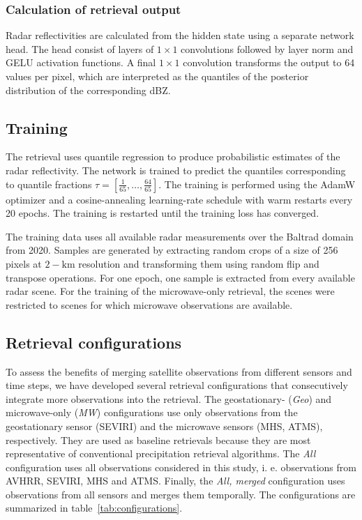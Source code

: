 \documentclass[11pt]{scrartcl}
\begin{document}
\subsubsection{Calculation of retrieval output}


Radar reflectivities are calculated from the hidden state using a separate
network head. The head consist of layers of $1 \times 1$ convolutions followed
by layer norm \citep{ba16} and GELU \citep{hendrycks16} activation functions. A
final $1 \times 1$ convolution transforms the output to 64 values per pixel,
which are interpreted as the quantiles of the posterior distribution of the
corresponding dBZ.

\subsection{Training}

The retrieval uses quantile regression \citep{pfreundschuh18} to produce
probabilistic estimates of the radar reflectivity. The network is trained to
predict the quantiles corresponding to quantile fractions $\tau = [\frac{1}{65},
  \ldots, \frac{64}{65}]$. The training is performed using the AdamW
\citep{loshchilov18} optimizer and a cosine-annealing learning-rate schedule
\citep{loshchilov16} with warm restarts every 20 epochs. The training is
restarted until the training loss has converged.

The training data uses all available radar measurements over the Baltrad domain
from 2020. Samples are generated by extracting random crops of a size of 256
pixels at $2-\si{\kilo \meter}$ resolution and transforming them using random
flip and transpose operations. For one epoch, one sample is extracted from every
available radar scene. For the training of the microwave-only retrieval,
the scenes were restricted to scenes for which microwave observations are
available.


\subsection{Retrieval configurations}

To assess the benefits of merging satellite observations from different sensors
and time steps, we have developed several retrieval configurations that
consecutively integrate more observations into the retrieval. The geostationary-
(\textit{Geo}) and microwave-only (\textit{MW}) configurations use only
observations from the geostationary sensor (SEVIRI) and the microwave sensors
(MHS, ATMS), respectively. They are used as baseline retrievals because they are
most representative of conventional precipitation retrieval algorithms. The
\textit{All} configuration uses all observations considered in this study, i. e.
observations from AVHRR, SEVIRI, MHS and ATMS. Finally, the \textit{All, merged}
configuration uses observations from all sensors and merges them temporally. The
configurations are summarized in table~\ref{tab:configurations}.
\end{document}
